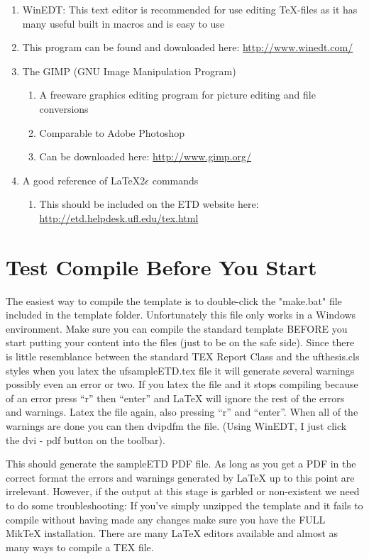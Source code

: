 \begin{enumerate} %
\item WinEDT: This text editor is recommended for use editing \TeX-files as it has many useful built in macros and is easy to use  %
\item This program can be found and downloaded here: \url{http://www.winedt.com/} %
\item The GIMP (GNU Image Manipulation Program) %
\begin{enumerate}%
\item A freeware graphics editing program for picture editing and file conversions \vspace{-10pt}%
\item Comparable to Adobe Photoshop %
\item Can be downloaded here: \url{http://www.gimp.org/}%
\end{enumerate}
\item A good reference of \LaTeX 2\ensuremath{\epsilon} commands%
\begin{enumerate}
\item This should be included on the ETD website here: \url{http://etd.helpdesk.ufl.edu/tex.html}
\end{enumerate}
\end{enumerate} %


\section{Test Compile Before You Start}
\sloppy The easiest way to compile the template is to double-click the "make.bat" file included in the template folder. Unfortunately this file only works in a Windows environment. Make sure you can compile the standard template BEFORE you start putting your content into the files (just to be on the safe side). Since there is little resemblance between the standard TEX Report Class and the ufthesis.cls styles when you latex the ufsampleETD.tex file it will generate several warnings possibly even an error or two. If you latex the file and it stops compiling because of an error press ``r'' then ``enter'' and LaTeX will ignore the rest of the errors and warnings. Latex the file again, also pressing ``r'' and ``enter''. 
When all of the warnings are done you can then dvipdfm the file. (Using WinEDT, I just click the dvi - pdf button on the toolbar).

This should generate the sampleETD PDF file.  As long as you get a PDF in the correct format the errors and warnings generated by LaTeX up to this point are irrelevant.  However, if the output at this stage is garbled or non-existent we need to do some troubleshooting:  If you've simply unzipped the template and it fails to compile without having made any changes make sure you have the FULL MikTeX installation. There are many LaTeX editors available and almost as many ways to compile a TEX file.

